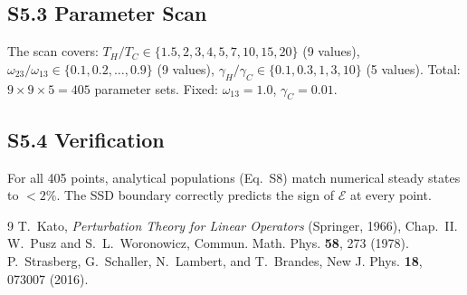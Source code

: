 \documentclass[prl,twocolumn,superscriptaddress,amsmath,amssymb]{revtex4-2}
\begin{document}
\subsection{S5.3 Parameter Scan}

The scan covers:
$T_H/T_C \in \{1.5, 2, 3, 4, 5, 7, 10, 15, 20\}$ (9 values),
$\omega_{23}/\omega_{13} \in \{0.1, 0.2, \ldots, 0.9\}$ (9 values),
$\gamma_H/\gamma_C \in \{0.1, 0.3, 1, 3, 10\}$ (5 values).
Total: $9 \times 9 \times 5 = 405$ parameter sets. Fixed: $\omega_{13} = 1.0$, $\gamma_C = 0.01$.

\subsection{S5.4 Verification}

For all 405 points, analytical populations (Eq.~S8) match numerical steady states to $< 2\%$. The SSD boundary correctly predicts the sign of $\mathcal{E}$ at every point.

\begin{thebibliography}{9}
 T.~Kato, \textit{Perturbation Theory for Linear Operators} (Springer, 1966), Chap.~II.
 W.~Pusz and S.~L.~Woronowicz, Commun. Math. Phys. \textbf{58}, 273 (1978).
 P.~Strasberg, G.~Schaller, N.~Lambert, and T.~Brandes, New J. Phys. \textbf{18}, 073007 (2016).
\end{thebibliography}
\end{document}
